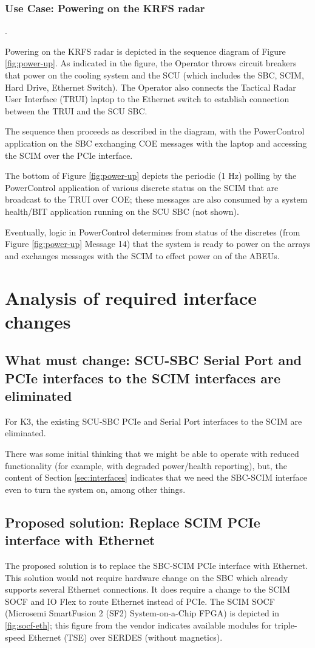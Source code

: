 \documentclass[12pt]{article}
\begin{document}
\subsubsection{Use Case: Powering on the KRFS radar}
\label{sec:power-up}.

Powering on the KRFS radar is depicted in the sequence diagram of Figure \ref{fig:power-up}.  As indicated in the figure, the Operator throws circuit breakers
that power on the cooling system and the SCU (which includes the SBC, SCIM, Hard Drive, Ethernet Switch).  The Operator also connects the Tactical Radar User Interface (TRUI) laptop to the Ethernet switch to establish connection between the TRUI and the SCU SBC.

The sequence then proceeds as described in the diagram, with the PowerControl application on the SBC exchanging COE messages with the laptop and accessing the SCIM over the PCIe interface.

The bottom of Figure \ref{fig:power-up} depicts the periodic (1 Hz) polling
by the PowerControl application of various discrete status on the SCIM that
are broadcast to the TRUI over COE; these messages are also consumed by a
system health/BIT application running on the SCU SBC (not shown).

Eventually, logic in PowerControl determines from status of the discretes (from Figure \ref{fig:power-up} Message 14) that the system is ready to power on the arrays and exchanges messages with the SCIM to effect power on of the ABEUs.


\section{Analysis of required interface changes}


\subsection{What must change: SCU-SBC Serial Port and PCIe interfaces to the SCIM interfaces are eliminated}

For K3, the existing SCU-SBC PCIe and Serial Port interfaces to the SCIM are eliminated.

There was some initial thinking that we might be able to operate with reduced functionality (for example, with degraded power/health reporting), but, the content of Section \ref{sec:interfaces} indicates that we need the SBC-SCIM interface even to turn the system on, among other things.

\subsection{Proposed solution: Replace SCIM PCIe interface with Ethernet}
The proposed solution is to replace the SBC-SCIM PCIe interface with Ethernet.
This solution would not require hardware change on the SBC which already supports several Ethernet connections.
It does require a change to the SCIM SOCF and IO Flex to route Ethernet instead of PCIe.  The SCIM SOCF (Microsemi SmartFusion 2 (SF2) System-on-a-Chip FPGA) is depicted in \ref{fig:socf-eth}; this figure from the vendor indicates available modules for triple-speed Ethernet (TSE) over SERDES (without magnetics).
\end{document}
